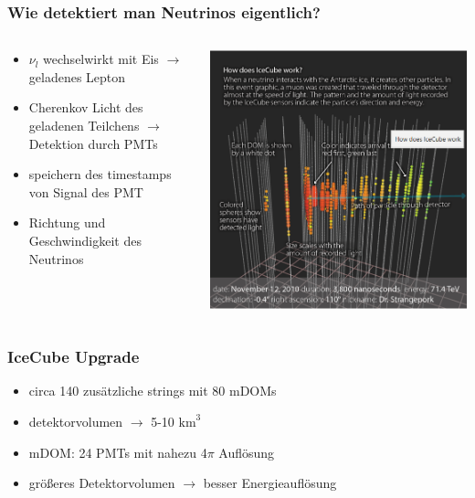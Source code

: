 \documentclass[aspectratio=1610, 9pt]{beamer}
\begin{document}
\begin{frame}\frametitle{Wie detektiert man Neutrinos eigentlich?}
  \begin{columns}
    \begin{column}[c]{0.45\textwidth}
      \begin{itemize}
      \item $\nu_{l}$ wechselwirkt mit Eis $\to$ geladenes Lepton
      \item Cherenkov Licht des geladenen Teilchens $\to$ Detektion durch PMTs
      \item speichern des timestamps von Signal des PMT
      \item Richtung und Geschwindigkeit des Neutrinos
      \end{itemize}
    \end{column}
    \begin{column}[c]{0.45\textwidth}
      \includegraphics{images/signal_test.png}
    \end{column}
  \end{columns}
\end{frame}

\begin{frame}\frametitle{IceCube Upgrade}
  \begin{itemize}
    \item circa 140 zus\"atzliche strings mit 80 mDOMs
    \item detektorvolumen $\to$ 5-10 $\text{km}^{3}$
    \item mDOM: 24 PMTs mit nahezu 4$\pi$ Aufl\"osung
    \item gr\"o\ss eres Detektorvolumen $\to$ besser Energieaufl\"osung
  \end{itemize}
\end{frame}
\end{document}
